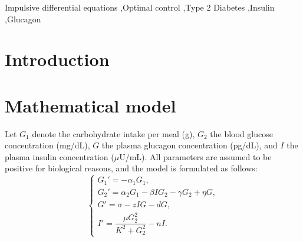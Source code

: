 \documentclass[a4paper,fleqn]{cas-sc}
\numberwithin{equation}{section}
\numberwithin{equation}{section}
\newcommand{\1}{\boldsymbol{1}}
\newcommand{\0}{\boldsymbol{0}}
\begin{document}
\begin{keywords}
Impulsive differential equations \sep Optimal control \sep Type 2 Diabetes \sep Insulin \sep Glucagon
\end{keywords}

\makeatletter
\let\printorcid\relax
\makeatother

\maketitle

\section{Introduction}

\section{Mathematical model}
Let $G_1$ denote the carbohydrate intake per meal (g), $G_2$ the blood glucose concentration (mg/dL), $G$ the plasma glucagon concentration (pg/dL), and $I$ the plasma insulin concentration ($\mu$U/mL). All parameters are assumed to be positive for biological reasons, and the model is formulated as follows:
\begin{equation}
    \begin{cases}
        G_1' = -\alpha_1 G_1, \\
        G_2' = \alpha_2 G_1 - \beta I G_2 - \gamma G_2 + \eta G,\\
        G' = \sigma - z I G - dG, \\
        I' = \dfrac{\mu G_2^2}{K^2 + G_2^2} - nI.
    \end{cases}
    \label{eq: model with no treatment}
\end{equation}

\end{document}
